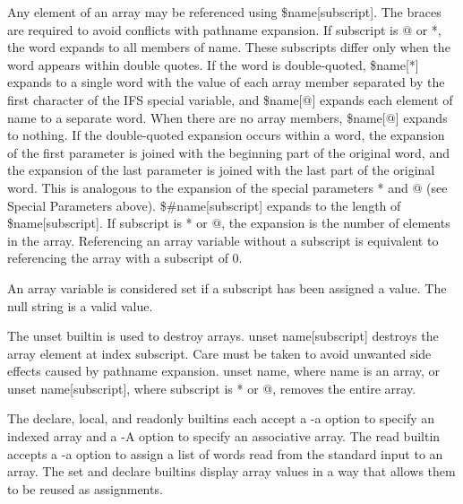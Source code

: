Any element of an array may be referenced using \${name[subscript]}. The braces are required to avoid conflicts with pathname expansion. If subscript is @ or *, the word expands to all members of name. These subscripts differ only when the word appears within double quotes. If the word is double-quoted, \${name[*]} expands to a single word with the value of each array member separated by the first character of the IFS special variable, and \${name[@]} expands each element of name to a separate word. When there are no array members, \${name[@]} expands to nothing. If the double-quoted expansion occurs within a word, the expansion of the first parameter is joined with the beginning part of the original word, and the expansion of the last parameter is joined with the last part of the original word. This is analogous to the expansion of the special parameters * and @ (see Special Parameters above). \${\#name[subscript]} expands to the length of \${name[subscript]}. If subscript is * or @, the expansion is the number of elements in the array. Referencing an array variable without a subscript is equivalent to referencing the array with a subscript of 0.

An array variable is considered set if a subscript has been assigned a value. The null string is a valid value.

The unset builtin is used to destroy arrays. unset name[subscript] destroys the array element at index subscript. Care must be taken to avoid unwanted side effects caused by pathname expansion. unset name, where name is an array, or unset name[subscript], where subscript is * or @, removes the entire array.

The declare, local, and readonly builtins each accept a -a option to specify an indexed array and a -A option to specify an associative array. The read builtin accepts a -a option to assign a list of words read from the standard input to an array. The set and declare builtins display array values in a way that allows them to be reused as assignments.